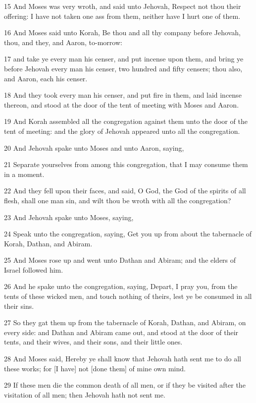 \par 15 And Moses was very wroth, and said unto Jehovah, Respect not thou their offering: I have not taken one ass from them, neither have I hurt one of them.
\par 16 And Moses said unto Korah, Be thou and all thy company before Jehovah, thou, and they, and Aaron, to-morrow:
\par 17 and take ye every man his censer, and put incense upon them, and bring ye before Jehovah every man his censer, two hundred and fifty censers; thou also, and Aaron, each his censer.
\par 18 And they took every man his censer, and put fire in them, and laid incense thereon, and stood at the door of the tent of meeting with Moses and Aaron.
\par 19 And Korah assembled all the congregation against them unto the door of the tent of meeting: and the glory of Jehovah appeared unto all the congregation.
\par 20 And Jehovah spake unto Moses and unto Aaron, saying,
\par 21 Separate yourselves from among this congregation, that I may consume them in a moment.
\par 22 And they fell upon their faces, and said, O God, the God of the spirits of all flesh, shall one man sin, and wilt thou be wroth with all the congregation?
\par 23 And Jehovah spake unto Moses, saying,
\par 24 Speak unto the congregation, saying, Get you up from about the tabernacle of Korah, Dathan, and Abiram.
\par 25 And Moses rose up and went unto Dathan and Abiram; and the elders of Israel followed him.
\par 26 And he spake unto the congregation, saying, Depart, I pray you, from the tents of these wicked men, and touch nothing of theirs, lest ye be consumed in all their sins.
\par 27 So they gat them up from the tabernacle of Korah, Dathan, and Abiram, on every side: and Dathan and Abiram came out, and stood at the door of their tents, and their wives, and their sons, and their little ones.
\par 28 And Moses said, Hereby ye shall know that Jehovah hath sent me to do all these works; for [I have] not [done them] of mine own mind.
\par 29 If these men die the common death of all men, or if they be visited after the visitation of all men; then Jehovah hath not sent me.
